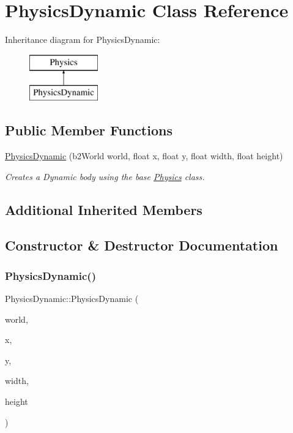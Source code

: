 \hypertarget{class_physics_dynamic}{}\section{Physics\+Dynamic Class Reference}
\label{class_physics_dynamic}
Inheritance diagram for Physics\+Dynamic\+:\begin{figure}[H]
\begin{center}
\leavevmode
\includegraphics[height=2.000000cm]{class_physics_dynamic}
\end{center}
\end{figure}
\subsection*{Public Member Functions}
\begin{DoxyCompactItemize}
\item 
\hyperlink{class_physics_dynamic_ae6d76e93d11871334b4481f47603705b}{Physics\+Dynamic} (b2\+World world, float x, float y, float width, float height)
\begin{DoxyCompactList}\small\item\em Creates a Dynamic body using the base \hyperlink{class_physics}{Physics} class. \end{DoxyCompactList}\end{DoxyCompactItemize}
\subsection*{Additional Inherited Members}


\subsection{Constructor \& Destructor Documentation}
\mbox{\label{class_physics_dynamic_ae6d76e93d11871334b4481f47603705b}} 
\subsubsection{\texorpdfstring{Physics\+Dynamic()}{PhysicsDynamic()}}
{\footnotesize\ttfamily Physics\+Dynamic\+::\+Physics\+Dynamic (\begin{DoxyParamCaption}\item[{b2\+World}]{world,  }\item[{float}]{x,  }\item[{float}]{y,  }\item[{float}]{width,  }\item[{float}]{height }\end{DoxyParamCaption})}



